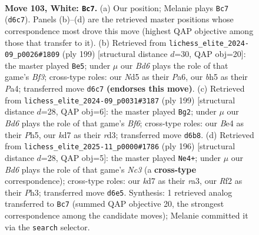 \documentclass[11pt]{article}
\begin{document}
\clearpage

\begin{figure}[p]\centering
\begin{subfigure}{0.46\textwidth}\centering
\resizebox{\linewidth}{!}{%
\newchessgame
\chessboard[
  setfen={8/3k4/PP1B4/3N3b/4B3/1K5p/5R2/6r1 w - - 5 103},
  showmover=false,
  pgfstyle=straightmove, color=movearrow, markmove={d6-c7}
]}
\caption{}
\end{subfigure}\hfill
\begin{subfigure}{0.46\textwidth}\centering
\resizebox{\linewidth}{!}{%
\newchessgame
\chessboard[
  setfen={R7/8/p4b2/1b1k1K2/p7/2P5/1P6/4r3 b - - 7 100},
  showmover=false,
  pgfstyle=straightmove, color=movearrow, markmove={f6-e5}
]}
\caption{}
\end{subfigure}
\\[4pt]
\begin{subfigure}{0.46\textwidth}\centering
\resizebox{\linewidth}{!}{%
\newchessgame
\chessboard[
  setfen={4k3/8/4r3/2P3Bp/1K6/3R1bP1/8/8 b - - 16 100},
  showmover=false,
  pgfstyle=straightmove, color=movearrow, markmove={f3-g2}
]}
\caption{}
\end{subfigure}\hfill
\begin{subfigure}{0.46\textwidth}\centering
\resizebox{\linewidth}{!}{%
\newchessgame
\chessboard[
  setfen={2B5/8/8/2k4b/5p1p/r1N4P/5K2/8 w - - 6 99},
  showmover=false,
  pgfstyle=straightmove, color=movearrow, markmove={c3-e4}
]}
\caption{}
\end{subfigure}
\caption{\textbf{Move 103, White: \texttt{Bc7}.} (a) Our position; Melanie plays \texttt{Bc7} (\texttt{d6c7}). Panels (b)--(d) are the retrieved master positions whose correspondence most drove this move (highest QAP objective among those that transfer to it). (b) Retrieved from \texttt{lichess\_elite\_2024-09\_p0026\#1809} (ply 199) [structural distance $d$=30, QAP obj=20]: the master played \texttt{Be5}; under $\mu$ our \emph{Bd6} plays the role of that game's \emph{Bf3}; cross-type roles: our \emph{N}d5 as their \emph{P}a6, our \emph{b}h5 as their \emph{P}a4; transferred move \texttt{d6c7} \textbf{(endorses this move)}. (c) Retrieved from \texttt{lichess\_elite\_2024-09\_p0031\#3187} (ply 199) [structural distance $d$=28, QAP obj=6]: the master played \texttt{Bg2}; under $\mu$ our \emph{Bd6} plays the role of that game's \emph{Bf6}; cross-type roles: our \emph{B}e4 as their \emph{P}h5, our \emph{k}d7 as their \emph{r}d3; transferred move \texttt{d6b8}. (d) Retrieved from \texttt{lichess\_elite\_2025-11\_p0000\#1786} (ply 196) [structural distance $d$=28, QAP obj=5]: the master played \texttt{Ne4+}; under $\mu$ our \emph{Bd6} plays the role of that game's \emph{Nc3} (a \textbf{cross-type} correspondence); cross-type roles: our \emph{k}d7 as their \emph{r}a3, our \emph{R}f2 as their \emph{P}h3; transferred move \texttt{d6e5}. Synthesis: 1 retrieved analog transferred to \texttt{Bc7} (summed QAP objective 20, the strongest correspondence among the candidate moves); Melanie committed it via the \texttt{search} selector.}
\label{fig:thought-m204}
\end{figure}
\end{document}
